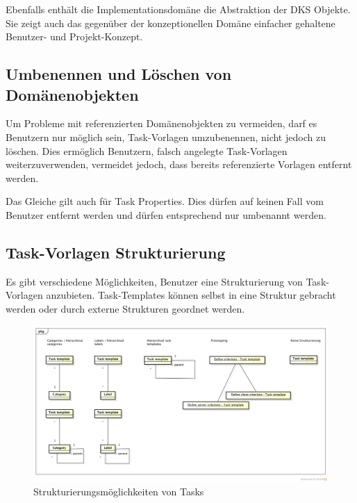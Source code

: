 			Ebenfalls enthält die Implementationsdomäne die Abstraktion der DKS Objekte.
			Sie zeigt auch das gegenüber der konzeptionellen Domäne einfacher gehaltene Benutzer- und Projekt-Konzept.
			
			
		\subsection{Umbenennen und Löschen von Domänenobjekten}
			Um Probleme mit referenzierten Domänenobjekten zu vermeiden,
			darf es Benutzern nur möglich sein, Task-Vorlagen umzubenennen,
			nicht jedoch zu löschen.
			Dies ermöglich Benutzern, 
			falsch angelegte Task-Vorlagen weiterzuverwenden, vermeidet jedoch, 
			dass bereits referenzierte Vorlagen entfernt werden.
			
			Das Gleiche gilt auch für Task Properties.
			Dies dürfen auf keinen Fall vom Benutzer entfernt werden 
			und dürfen entsprechend nur umbenannt werden.
			
		
		\subsection{Task-Vorlagen Strukturierung}
			Es gibt verschiedene Möglichkeiten, 
			Benutzer eine Strukturierung von Task-Vorlagen anzubieten.
			Task-Templates können selbst in eine Struktur gebracht werden
			oder durch externe Strukturen geordnet werden.
		
			\begin{figure}[H]
				\includegraphics[width=\textwidth]{architecture/media/img/taskTemplateStructure.png}
				\centering
				\caption{Strukturierungsmöglichkeiten von Tasks}
				\label{fig:taskTemplateStructure}
			\end{figure}
			

